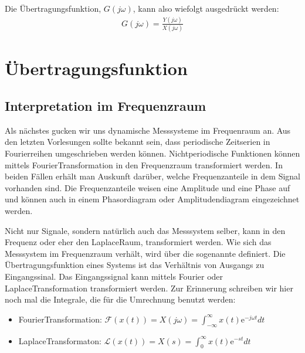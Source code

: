 \documentclass[letterpaper,10pt,english]{jupyterBook}
\begin{document}
\sphinxAtStartPar
Die Übertragungsfunktion, \(G(j \omega)\), kann also wiefolgt ausgedrückt werden:
\begin{equation*}
\begin{split}G(j \omega) = \frac{Y(j \omega)}{X(j \omega)}\end{split}
\end{equation*}
\sphinxstepscope


\section{Übertragungsfunktion}
\label{\detokenize{content/5_Uebertragungsfunktion:ubertragungsfunktion}}\label{\detokenize{content/5_Uebertragungsfunktion::doc}}

\subsection{Interpretation im Frequenzraum}
\label{\detokenize{content/5_Uebertragungsfunktion:interpretation-im-frequenzraum}}
\sphinxAtStartPar


\sphinxAtStartPar
Als nächstes gucken wir uns dynamische Messsysteme im Frequenraum an.
Aus den letzten Vorlesungen sollte bekannt sein, dass periodische Zeitserien in Fourierreihen umgeschrieben werden können. Nicht\sphinxhyphen{}periodische Funktionen können mittels Fourier\sphinxhyphen{}Transformation in den Frequenzraum transformiert werden. In beiden Fällen erhält man Auskunft darüber, welche Frequenzanteile in dem Signal vorhanden sind. Die Frequenzanteile weisen eine Amplitude und eine Phase auf und können auch in einem Phasordiagram oder Amplitudendiagram eingezeichnet werden.

\sphinxAtStartPar
Nicht nur Signale, sondern natürlich auch das Messsystem selber, kann in den Frequenz\sphinxhyphen{} oder eher den Laplace\sphinxhyphen{}Raum, transformiert werden. Wie sich das Messsystem im Frequenzraum verhält, wird über die sogenannte  definiert. Die Übertragungsfunktion eines Systems ist das Verhältnis von Ausgangs\sphinxhyphen{} zu Eingangssinal. Das Eingangssignal kann mittels Fourier\sphinxhyphen{} oder Laplace\sphinxhyphen{}Transformation transformiert werden. Zur Erinnerung schreiben wir hier noch mal die Integrale, die für die Umrechnung benutzt werden:
\begin{itemize}
\item {} 
\sphinxAtStartPar
Fourier\sphinxhyphen{}Transformation: \(\mathcal F(x(t)) = X(j\omega) = \int_{-\infty}^{\infty} x(t) \mathrm e^{-j \omega t} dt\)

\item {} 
\sphinxAtStartPar
Laplace\sphinxhyphen{}Transformaton: \(\mathcal L(x(t)) = X(s) = \int_{0}^{\infty} x(t) \mathrm e^{-st} dt\)

\end{itemize}
\end{document}
